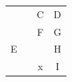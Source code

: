 \documentclass{article}
\begin{document}
\begin{NiceTabular}{cccc}
 & & C & D \\
 & & F & G \\
E &  & & H \\
 & & x & I \\
\end{NiceTabular}
\end{document}

